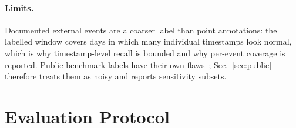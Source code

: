 \documentclass[10pt,twocolumn]{article}
\begin{document}
\begin{table}[t]
\centering\scriptsize\setlength{\tabcolsep}{4pt}

\caption{ERCOT label tiers, five-detector pipeline (single run): where each detector's flags fall and F1 with Tier~1 only versus Tier~1 plus the post-hoc Tier~2 window. Protocol A: forward split; B: clean-window split. Intervals are day-block bootstrap.}\label{tab:tiers}
\end{table}

\paragraph{Limits.} Documented external events are a coarser label than point annotations: the labelled window covers days in which many individual timestamps look normal, which is why timestamp-level recall is bounded and why per-event coverage is reported. Public benchmark labels have their own flaws~\cite{wu2023flawed}; Sec.~\ref{sec:public} therefore treats them as noisy and reports sensitivity subsets.

\section{Evaluation Protocol}\label{sec:protocol}
\end{document}
